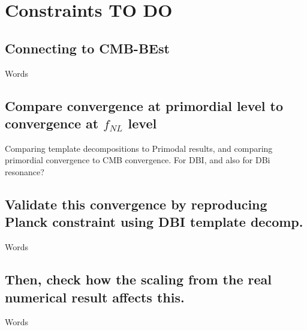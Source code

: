 %
\chapter{Constraints TO DO}\label{chapter:constraints}
\section{Connecting to CMB-BEst}
    Words
\section{Compare convergence at primordial level to convergence at $f_{NL}$ level}
    Comparing template decompositions to Primodal results,
    and comparing primordial convergence to CMB convergence.
    For DBI, and also for DBi resonance?
\section{Validate this convergence by reproducing Planck constraint using DBI template decomp.}
    Words
\section{Then, check how the scaling from the real numerical result affects this.}
    Words
